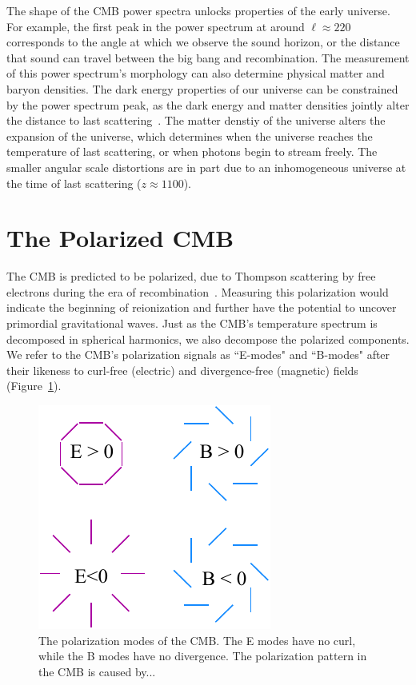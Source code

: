 The shape of the CMB power spectra unlocks properties of the early universe.  For example, the first peak in the power spectrum at around $\ell\approx220$ corresponds to the angle at which we observe the sound horizon, or the distance that sound can travel between the big bang and recombination.  The measurement of this power spectrum's morphology can also determine physical matter and baryon densities.  The dark energy properties of our universe can be constrained by the power spectrum peak, as the dark energy and matter densities jointly alter the distance to last scattering~\cite{Hadzhiyska_2019}.  The matter denstiy of the universe alters the expansion of the universe, which determines when the universe reaches the temperature of last scattering, or when photons begin to stream freely.  The smaller angular scale distortions are in part due to an inhomogeneous universe at the time of last scattering ($z\approx 1100$).  

\section{The Polarized CMB}

The CMB is predicted to be polarized, due to Thompson scattering by free electrons during the era of recombination~\cite{weinberg_cosmo,Page_2007}.  Measuring this polarization would indicate the beginning of reionization and further have the potential to uncover primordial gravitational waves.  Just as the CMB's temperature spectrum is decomposed in spherical harmonics, we also decompose the polarized components.  We refer to the CMB's polarization signals as ``E-modes" and ``B-modes" after their likeness to curl-free (electric) and divergence-free (magnetic) fields (Figure~\ref{fig:e_b_pol}).
\begin{figure}
    \centering
    \includegraphics[width = .45\textwidth]{Figures/EB_pol.pdf}
    \caption{The polarization modes of the CMB.  The E modes have no curl, while the B modes have no divergence.  The polarization pattern in the CMB is caused by...}
    \label{fig:e_b_pol}
\end{figure}

